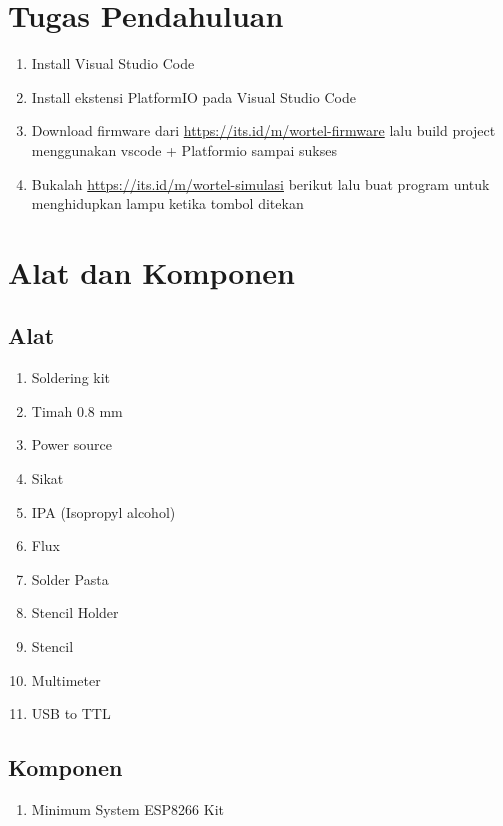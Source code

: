 \section{Tugas Pendahuluan}
\begin{enumerate}
    \item Install Visual Studio Code 
    \item Install ekstensi PlatformIO pada Visual Studio Code 
    \item Download firmware dari \url{https://its.id/m/wortel-firmware} lalu build project menggunakan vscode + Platformio sampai sukses
    \item Bukalah \url{https://its.id/m/wortel-simulasi} berikut lalu buat program untuk menghidupkan lampu ketika tombol ditekan

\end{enumerate}

\section{Alat dan Komponen}
\subsection{Alat}
\begin{enumerate}
    \item Soldering kit
    \item Timah 0.8 mm
    \item Power source
    \item Sikat 
    \item IPA (Isopropyl alcohol)
    \item Flux
    \item Solder Pasta
    \item Stencil Holder
    \item Stencil
    \item Multimeter
    \item USB to TTL
\end{enumerate}

\subsection{Komponen}
\begin{enumerate}
    \item Minimum System ESP8266 Kit
\end{enumerate}

